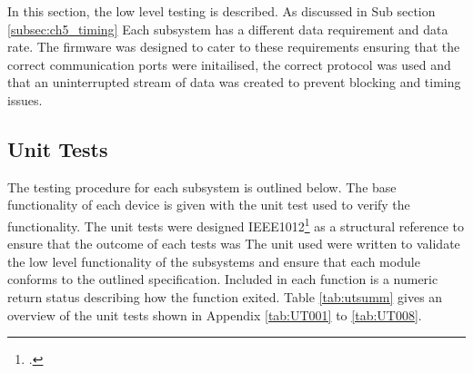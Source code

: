 

In this section, the low level testing is described. As discussed in Sub section \ref{subsec:ch5_timing} Each subsystem has a different data requirement and data rate. The firmware was designed to cater to these requirements ensuring that the correct communication ports were initailised, the correct protocol was used and that an uninterrupted stream of data was created to prevent blocking and timing issues. \par 
 
 \subsection{Unit Tests}
The testing procedure for each subsystem is outlined below. The base functionality of each device is given with the unit test used to verify the functionality. The unit tests were designed IEEE1012\footcite{IEEE_STDVV} as a structural reference to ensure that the outcome of each tests was The unit used  were written to validate the low level functionality of the subsystems and ensure that each module conforms to the outlined specification. Included in each function is a numeric return status describing how the function exited. Table \ref{tab:utsumm} gives an overview of the unit tests shown in Appendix \ref{tab:UT001} to \ref{tab:UT008}.

